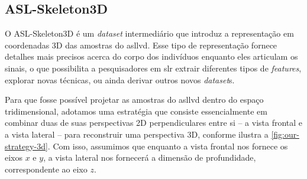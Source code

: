 \subsection{ASL-Skeleton3D}
\label{sec:metodologia-datasets-3d}

O ASL-Skeleton3D é um \textit{dataset} intermediário que introduz a representação em coordenadas 3D das amostras do \acrshort{asllvd}. Esse tipo de representação fornece detalhes mais precisos acerca do corpo dos indivíduos enquanto eles articulam os sinais, o que possibilita a pesquisadores em \acrshort{slr} extrair diferentes tipos de \textit{features}, explorar novas técnicas, ou ainda derivar outros novos \textit{dataset}s.

Para que fosse possível projetar as amostras do \acrshort{asllvd} dentro do espaço tridimensional, adotamos uma estratégia que consiste essencialmente em combinar duas de suas perspectivas 2D perpendiculares entre si -- a vista frontal e a vista lateral -- para reconstruir uma perspectiva 3D, conforme ilustra a \autoref{fig:our-strategy-3d}. Com isso, assumimos que enquanto a vista frontal nos fornece os eixos \(x\) e \(y\), a vista lateral nos fornecerá a dimensão de profundidade, correspondente ao eixo \( z\).


